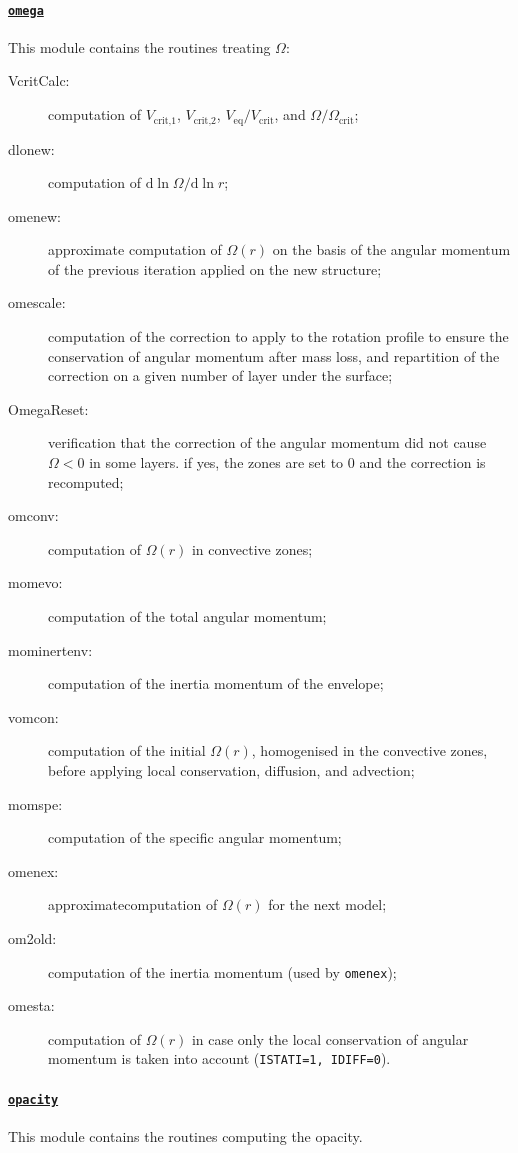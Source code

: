 \documentclass[11pt]{article}
\def\om{\ensuremath{\Omega}}
\begin{document}
\paragraph{\underline{\texttt{omega}}}
This module contains the routines treating \om:

\begin{description}
 \item[VcritCalc:] computation of $V_\text{crit,1}$, $V_\text{crit,2}$, $V_\text{eq}/V_\text{crit}$, and $\Omega/\Omega_\text{crit}$;
 \item[dlonew:] computation of $\text{d}\ln \Omega/\text{d}\ln r$;
 \item[omenew:] approximate computation of $\Omega(r)$ on the basis of the angular momentum of the previous iteration applied on the new structure;
 \item[omescale:] computation of the correction to apply to the rotation profile to ensure the conservation of angular momentum after mass loss, and repartition of the correction on a given number of layer under the surface;
 \item[OmegaReset:] verification that the correction of the angular momentum did not cause $\Omega<0$ in some layers. if yes, the zones are set to 0 and the correction is recomputed;
 \item[omconv:] computation of $\Omega(r)$ in convective zones;
 \item[momevo:] computation of the total angular momentum;
 \item[mominertenv:] computation of the inertia momentum of the envelope;
 \item[vomcon:] computation of the initial $\Omega(r)$, homogenised in the convective zones, before applying local conservation, diffusion, and advection;
 \item[momspe:] computation of the specific angular momentum;
 \item[omenex:] approximatecomputation of $\Omega(r)$ for the next model;
 \item[om2old:] computation of the inertia momentum (used by \texttt{omenex});
 \item[omesta:] computation of $\Omega(r)$ in case only the local conservation of angular momentum is taken into account (\verb?ISTATI=1, IDIFF=0?).
 \end{description}

\paragraph{\underline{\texttt{opacity}}}
This module contains the routines computing the opacity.
\end{document}
